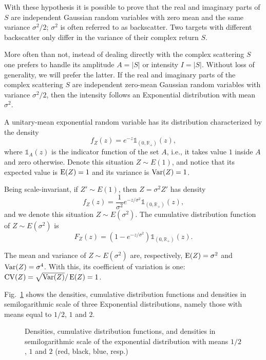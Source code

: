 With these hypothesis it is possible to prove that the real and imaginary parts of $S$ are independent Gaussian random variables with zero mean and the same variance $\sigma^2/2$; $\sigma^2$ is often referred to as backscatter.
Two targets with different backscatter only differ in the variance of their complex return $S$.

More often than not, instead of dealing directly with the complex scattering $S$ one prefers to handle its amplitude $A=|S|$ or intensity $I=|S|$.
Without loss of generality, we will prefer the latter.
If the real and imaginary parts of the complex scattering $S$ are independent zero-mean Gaussian random variables with variance $\sigma^2/2$, then the intensity follows an Exponential distribution with mean $\sigma^2$.

A unitary-mean exponential random variable has its distribution characterized by the density
\begin{equation}
f_Z(z) = e^{-z} \mathbb 1_{(0,\mathbb R_+)}(z),
\end{equation}
where $\mathbb 1_{A}(z)$ is the indicator function of the set $A$, i.e., it takes value $1$ inside $A$ and zero otherwise.
Denote this situation $Z\sim E(1)$, and notice that its expected value is $\operatorname{E}(Z)=1$ and its variance is $\operatorname{Var}(Z)=1$.

Being scale-invariant, if $Z'\sim E(1)$, then $Z=\sigma^2 Z'$ has density
\begin{equation}
f_Z(z) = \frac{1}{\sigma^2}e^{-z/\sigma^2} \mathbb 1_{(0,\mathbb R_+)}(z),
\end{equation}
and we denote this situation $Z\sim E(\sigma^2)$.
The cumulative distribution function of $Z\sim E(\sigma^2)$ is 
\begin{equation}
F_Z(z) = (1-e^{-z/\sigma^2}) \mathbb 1_{(0,\mathbb R_+)}(z).
\end{equation}

The mean and variance of $Z\sim E(\sigma^2)$ are, respectively, $\operatorname{E}(Z)=\sigma^2$ and $\operatorname{Var}(Z) = \sigma^4$.
With this, its coefficient of variation is one: $\operatorname{CV}(Z) = \sqrt{\operatorname{Var}(Z)}/\operatorname{E}(Z) = 1$.

Fig.~\ref{Fig:ExponentialDistribution} shows the densities, cumulative distribution functions and densities in semilogarithmic scale of three Exponential distributions, namely those with means equal to $1/2$, $1$ and $2$.

\begin{figure}[hbt]
\centering
{}
\caption{Densities, cumulative distribution functions, and densities in semilogarithmic scale of the exponential distribution with means $1/2$, $1$ and $2$ (red, black, blue, resp.)}\label{Fig:ExponentialDistribution}
\end{figure}

